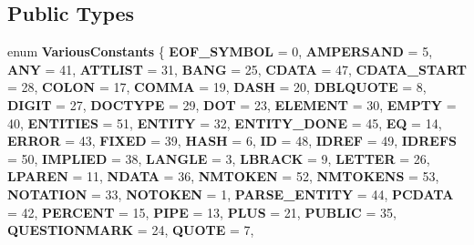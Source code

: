 \subsection*{Public Types}
\begin{DoxyCompactItemize}
\item 
\mbox{\label{class_xml_stream_reader___table_af6a17409e72dbdc4d1862a4804bb1990}} 
enum {\bfseries Various\+Constants} \{ \newline
{\bfseries E\+O\+F\+\_\+\+S\+Y\+M\+B\+OL} = 0, 
{\bfseries A\+M\+P\+E\+R\+S\+A\+ND} = 5, 
{\bfseries A\+NY} = 41, 
{\bfseries A\+T\+T\+L\+I\+ST} = 31, 
\newline
{\bfseries B\+A\+NG} = 25, 
{\bfseries C\+D\+A\+TA} = 47, 
{\bfseries C\+D\+A\+T\+A\+\_\+\+S\+T\+A\+RT} = 28, 
{\bfseries C\+O\+L\+ON} = 17, 
\newline
{\bfseries C\+O\+M\+MA} = 19, 
{\bfseries D\+A\+SH} = 20, 
{\bfseries D\+B\+L\+Q\+U\+O\+TE} = 8, 
{\bfseries D\+I\+G\+IT} = 27, 
\newline
{\bfseries D\+O\+C\+T\+Y\+PE} = 29, 
{\bfseries D\+OT} = 23, 
{\bfseries E\+L\+E\+M\+E\+NT} = 30, 
{\bfseries E\+M\+P\+TY} = 40, 
\newline
{\bfseries E\+N\+T\+I\+T\+I\+ES} = 51, 
{\bfseries E\+N\+T\+I\+TY} = 32, 
{\bfseries E\+N\+T\+I\+T\+Y\+\_\+\+D\+O\+NE} = 45, 
{\bfseries EQ} = 14, 
\newline
{\bfseries E\+R\+R\+OR} = 43, 
{\bfseries F\+I\+X\+ED} = 39, 
{\bfseries H\+A\+SH} = 6, 
{\bfseries ID} = 48, 
\newline
{\bfseries I\+D\+R\+EF} = 49, 
{\bfseries I\+D\+R\+E\+FS} = 50, 
{\bfseries I\+M\+P\+L\+I\+ED} = 38, 
{\bfseries L\+A\+N\+G\+LE} = 3, 
\newline
{\bfseries L\+B\+R\+A\+CK} = 9, 
{\bfseries L\+E\+T\+T\+ER} = 26, 
{\bfseries L\+P\+A\+R\+EN} = 11, 
{\bfseries N\+D\+A\+TA} = 36, 
\newline
{\bfseries N\+M\+T\+O\+K\+EN} = 52, 
{\bfseries N\+M\+T\+O\+K\+E\+NS} = 53, 
{\bfseries N\+O\+T\+A\+T\+I\+ON} = 33, 
{\bfseries N\+O\+T\+O\+K\+EN} = 1, 
\newline
{\bfseries P\+A\+R\+S\+E\+\_\+\+E\+N\+T\+I\+TY} = 44, 
{\bfseries P\+C\+D\+A\+TA} = 42, 
{\bfseries P\+E\+R\+C\+E\+NT} = 15, 
{\bfseries P\+I\+PE} = 13, 
\newline
{\bfseries P\+L\+US} = 21, 
{\bfseries P\+U\+B\+L\+IC} = 35, 
{\bfseries Q\+U\+E\+S\+T\+I\+O\+N\+M\+A\+RK} = 24, 
{\bfseries Q\+U\+O\+TE} = 7, 
\newline

\end{DoxyCompactItemize}
